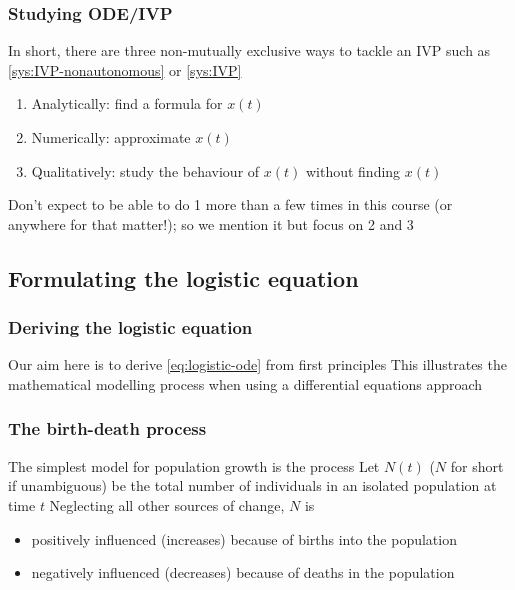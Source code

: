 \documentclass[aspectratio=169]{beamer}
\begin{document}
\begin{frame}\frametitle{Studying ODE/IVP}
In short, there are three non-mutually exclusive ways to tackle an IVP such as \eqref{sys:IVP-nonautonomous} or \eqref{sys:IVP}
\vfill
\begin{enumerate}
\item Analytically: find a formula for $x(t)$
\vfill
\item Numerically: approximate $x(t)$
\vfill
\item Qualitatively: study the behaviour of $x(t)$ without finding $x(t)$
\end{enumerate}
\vfill
Don't expect to be able to do 1 more than a few times in this course (or anywhere for that matter!); so we mention it but focus on 2 and 3
\end{frame}


\subsection{Formulating the logistic equation}


\begin{frame}\frametitle{Deriving the logistic equation}
Our aim here is to derive \eqref{eq:logistic-ode} from first principles
\vfill
This illustrates the mathematical modelling process when using a differential equations approach
\end{frame}

\begin{frame}\frametitle{The birth-death process}
The simplest model for population growth is the  process
\vfill
Let $N(t)$ ($N$ for short if unambiguous) be the total number of individuals in an isolated population at time $t$
\vfill
Neglecting all other sources of change, $N$ is
\begin{itemize}
\item positively influenced (increases) because of births into the population
\item negatively influenced (decreases) because of deaths in the population
\end{itemize}
\end{frame}
\end{document}
